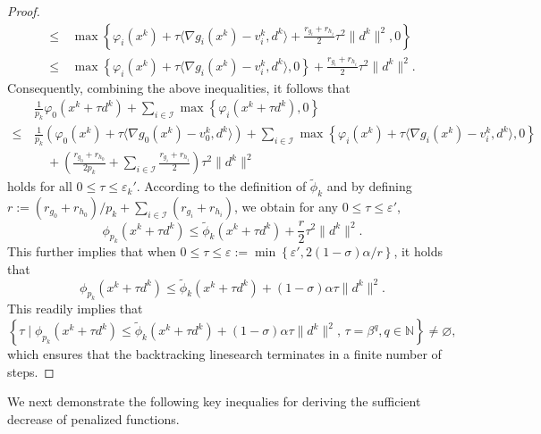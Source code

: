 \documentclass[11pt,a4paper]{article}
\theoremstyle{plain}
\begin{document}
\begin{proof}
\begin{equation*}
\begin{aligned}
   \leq \, & \max\left\{ \varphi_i(x^k) + \tau\langle \nabla g_i(x^k) -v_i^k,d^k \rangle + \frac{r_{g_i}+r_{h_i}}{2}\tau^2\|d^k\|^2, 0 \right\} \\
   \leq \, & \max\left\{ \varphi_i(x^k) + \tau\langle \nabla g_i(x^k) -v_i^k,d^k \rangle, 0 \right\} + \frac{r_{g_i}+r_{h_i}}{2}\tau^2\|d^k\|^2.
   \end{aligned} 
\end{equation*}
Consequently, combining the above inequalities, it follows that
\begin{equation*}
    \begin{aligned}
       &\frac{1}{p_k}{\varphi_0}(x^k+ \tau d^k) + {\sum_{i\in\mathcal{I}}} \max\left\{ {\varphi_i}(x^k+\tau d^k), 0\right\} \\
       \leq \, & \frac{1}{p_k}\left( {\varphi_0}(x^k) + \tau \langle \nabla g_0(x^k)-v_0^k,d^k \rangle\right) + {\sum_{i\in\mathcal{I}}} \max\left\{ {\varphi_i}(x^k) + \tau \langle \nabla g_i(x^k)-v_i^k,d^k \rangle, 0 \right\} \\
       &\quad + \left( \frac{r_{g_0} + r_{h_0}}{2p_k} + \sum_{i\in\mathcal{I}} \frac{r_{g_i} + r_{h_i}}{2} \right) \tau^2 \|d^k\|^2
    \end{aligned}
\end{equation*}
holds for all $0 \le \tau \le \varepsilon_k'$. According to the definition of $\tilde{\phi}_k$ and by defining $r := (r_{g_0}+r_{h_0})/p_k + \sum_{i\in\mathcal I} (r_{g_i}+r_{h_i})$, we obtain for any $0 \le \tau \le \varepsilon' $,
\begin{equation}\label{eq:quadratic_bound}
      \phi_{p_k}(x^k+\tau d^k) \leq \tilde\phi_k(x^k+ \tau d^k)+\frac{r}{2}\tau ^2\|d^k\|^2.
\end{equation}
This further implies that when $0 \le \tau \le \varepsilon := \min\left\{\varepsilon', 2(1-\sigma)\alpha/r \right\}$, it holds that
\[
\phi_{p_k}(x^k+\tau d^k) \leq \tilde\phi_k(x^k+ \tau d^k)+ (1-\sigma) \alpha \tau \|d^k\|^2.
\]
This readily implies that
\begin{equation*}
\left\{\tau \mid 
\phi_{p_k}(x^k + \tau d^k) 
\leq \tilde\phi_k(x^k+ \tau d^k)+ (1-\sigma) \alpha \tau \|d^k\|^2, \,  \tau = \beta^q, q \in \mathbb{N} 	\right\} \neq
\varnothing,
\end{equation*}
which ensures that the backtracking linesearch terminates in a finite number of steps.
\end{proof}\vspace*{0.05in}


We next demonstrate the following key inequalies for deriving the sufficient decrease of penalized functions.
\end{document}
